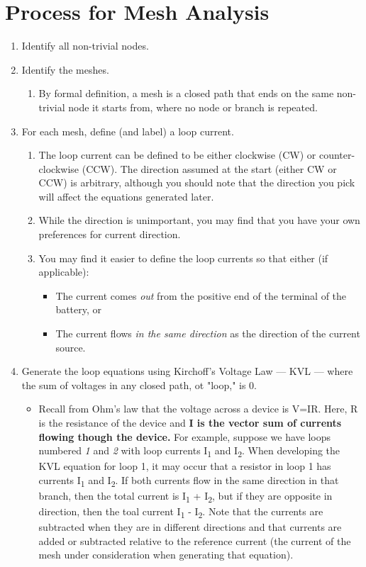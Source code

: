 \documentclass[12 pt,letterpaper]{article}
\begin{document}
\section{Process for Mesh Analysis}
\begin{enumerate}
\item Identify all non-trivial nodes.
\item Identify the meshes.
	\begin{enumerate}
	\item By formal definition, a mesh is a closed path that ends on the same non-trivial node it starts from, where no node or branch is repeated.
	\end{enumerate}
\item For each mesh, define (and label) a loop current.
	\begin{enumerate}
	\item The loop current can be defined to be either clockwise (CW) or counter-clockwise (CCW). The direction assumed at the start (either CW or CCW) is arbitrary, although you should note that the direction you pick will affect the equations generated later.
	\item While the direction is unimportant, you may find that you have your own preferences for current direction.
	\item You may find it easier to define the loop currents so that either (if applicable):
		\begin{itemize}
		\item The current comes \textit{out} from the positive end of the terminal of the battery, or
		\item The current flows \textit{in the same direction} as the direction of the current source.
		\end{itemize}
	\end{enumerate}
\item Generate the loop equations using Kirchoff's Voltage Law --- KVL --- where the sum of voltages in any closed path, ot "loop," is 0.
	\begin{itemize}
	\item Recall from Ohm's law that the voltage across a device is V=IR. Here, R is the resistance of the device and \textbf{I is the vector sum of currents flowing though the device.} For example, suppose we have loops numbered \textit{1} and \textit{2} with loop currents I\textsubscript{1} and I\textsubscript{2}. When developing the KVL equation for loop 1, it may occur that a resistor in loop 1 has currents  I\textsubscript{1} and I\textsubscript{2}. If both currents flow in the same direction in that branch, then the total current is  I\textsubscript{1} + I\textsubscript{2}, but if they are opposite in direction, then the toal current  I\textsubscript{1} - I\textsubscript{2}. Note that the currents are subtracted when they are in different directions and that currents are added or subtracted relative to the reference current (the current of the mesh under consideration when generating that equation).

\end{itemize}
\end{enumerate}
\end{document}
